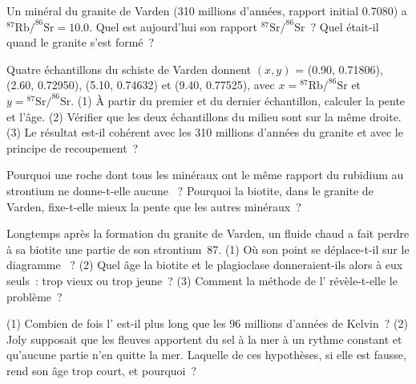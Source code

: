 \begin{exercise}[$\star\star$]\label{exo:g12:age-of-the-earth:6}
Un minéral du granite de Varden (310 millions d'années, rapport initial
0.7080) a $^{87}\mathrm{Rb}/^{86}\mathrm{Sr} = 10.0$. Quel est
aujourd'hui son rapport $^{87}\mathrm{Sr}/^{86}\mathrm{Sr}$~? Quel était-il
quand le granite s'est formé~?
\end{exercise}

\begin{exercise}[$\star\star$]\label{exo:g12:age-of-the-earth:7}
Quatre échantillons du schiste de Varden donnent $(x, y)$ = (0.90, 0.71806),
(2.60, 0.72950), (5.10, 0.74632) et (9.40, 0.77525), avec $x =
{}^{87}\mathrm{Rb}/^{86}\mathrm{Sr}$ et $y = {}^{87}\mathrm{Sr}/^{86}\mathrm{Sr}$.
(1) À partir du premier et du dernier échantillon, calculer la pente et
l'âge. (2) Vérifier que les deux échantillons du milieu sont sur la même
droite. (3) Le résultat est-il cohérent avec les 310 millions d'années du
granite et avec le principe de recoupement~?
\end{exercise}

\begin{exercise}[$\star\star$]\label{exo:g12:age-of-the-earth:8}
Pourquoi une roche dont tous les minéraux ont le même rapport du rubidium
au strontium ne donne-t-elle aucune ~? Pourquoi la biotite, dans
le granite de Varden, fixe-t-elle mieux la pente que les autres minéraux~?
\end{exercise}

\begin{exercise}[$\star\star$]\label{exo:g12:age-of-the-earth:9}
Longtemps après la formation du granite de Varden, un fluide chaud a fait
perdre à sa biotite une partie de son strontium~87. (1) Où son point se
déplace-t-il sur le diagramme ~? (2) Quel âge la biotite et le
plagioclase donneraient-ils alors à eux seuls~: trop vieux ou trop
jeune~? (3) Comment la méthode de l' révèle-t-elle le problème~?
\end{exercise}

\begin{exercise}[$\star\star$]\label{exo:g12:age-of-the-earth:10}
(1) Combien de fois l' est-il plus long que les 96 millions
d'années de Kelvin~? (2) Joly supposait que les fleuves apportent du sel à
la mer à un rythme constant et qu'aucune partie n'en quitte la mer.
Laquelle de ces hypothèses, si elle est fausse, rend son âge trop court, et
pourquoi~?
\end{exercise}

